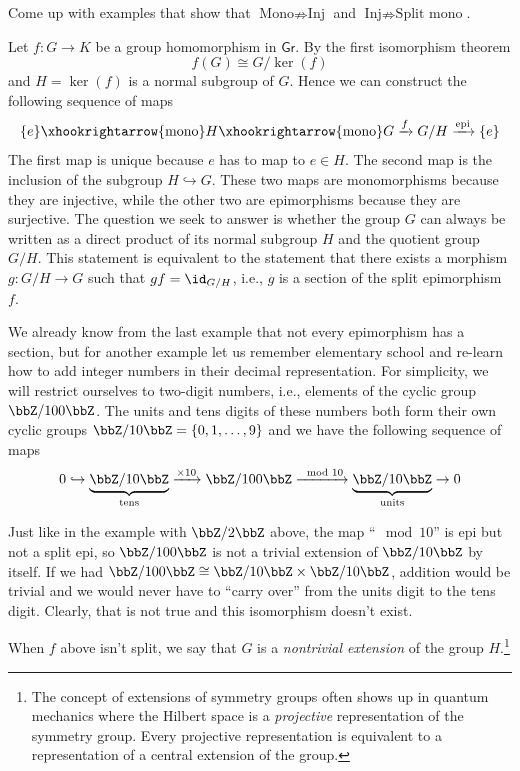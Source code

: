 \begin{xca}
    Come up with examples that show that $\text{Mono}\nRightarrow\text{Inj}$
    and $\text{Inj}\nRightarrow\text{Split mono}$.
\end{xca}
\begin{example}
    Let $f:G\rightarrow K$ be a group homomorphism in $\mathsf{Gr}$.
    By the first isomorphism theorem 
    \begin{equation}
        f(G)\cong G/\ker(f)
    \end{equation}
    and $H=\ker(f)$ is a normal subgroup of $G$. Hence we can construct
    the following sequence of maps
    \begin{equation}
        \{e\}\xhookrightarrow{\text{mono}}H\xhookrightarrow{\text{mono}}G\xrightarrow{f}G/H\xrightarrow{\text{epi}}\{e\}
    \end{equation}
    The first map is unique because $e$ has to map to $e\in H$. The second map is the inclusion of the subgroup $H\hookrightarrow G$. These two maps are monomorphisms because they are injective, while
    the other two are epimorphisms because they are surjective. The question
    we seek to answer is whether the group $G$ can always be written as
    a direct product of its normal subgroup $H$ and the quotient group $G/H$.
    This statement is equivalent to the statement that there exists a morphism
    $g:G/H\rightarrow G$ such that $gf=\id_{G/H}$, i.e., $g$ is a section
    of the split epimorphism $f$. 

    We already know from the last example that not every epimorphism has a section, but for another example let us remember elementary school and
    re-learn how to add integer numbers in their decimal representation. For simplicity, we will restrict ourselves
    to two-digit numbers, i.e., elements of the cyclic group $\bbZ/100\bbZ$.
    The units and tens digits of these numbers both form their own cyclic
    groups $\bbZ/10\bbZ=\{0,1,\ldots,9\}$ and we have the following
    sequence of maps 
    \begin{equation}
    0\hookrightarrow\underbrace{\bbZ/10\bbZ}_\text{tens}\xrightarrow{\times10}\bbZ/100\bbZ\xrightarrow{\mod 10}\underbrace{\bbZ/10\bbZ}_\text{units}\rightarrow0
    \end{equation}

    Just like in the example with $\bbZ/2\bbZ$ above, the map ``$\mod 10$'' is epi but not a split epi, so $\bbZ/100\bbZ$ is not a trivial extension of $\bbZ/10\bbZ$ by itself. If we had $\bbZ/100\bbZ\cong\bbZ/10\bbZ\times\bbZ/10\bbZ$,
    addition would be trivial and we would never have to ``carry over''
    from the units digit to the tens digit. Clearly, that is not true
    and this isomorphism doesn't exist. 

    When $f$ above isn't split, we say that $G$ is a \emph{nontrivial extension}
    of the group $H$.\footnote{The concept of extensions of symmetry groups often shows up in quantum
    mechanics where the Hilbert space is a \emph{projective} representation of
    the symmetry group. Every projective representation is equivalent to a representation of a central
    extension of the group.}
\end{example}
